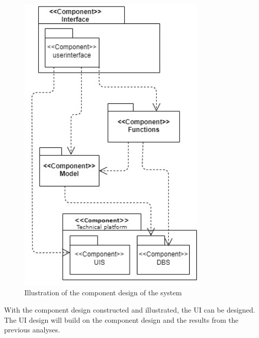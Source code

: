 \begin{figure}[H]
    \centering
    \includegraphics[width=0.8\textwidth]{figures/ComponentDiagrams/Componentdiagram.jpg}
    \caption{Illustration of the component design of the system}
    \label{fig:FinalComponentDesign}
\end{figure}

With the component design constructed and illustrated, the UI can be designed. The UI design will build on the component design and the results from the previous analyses.